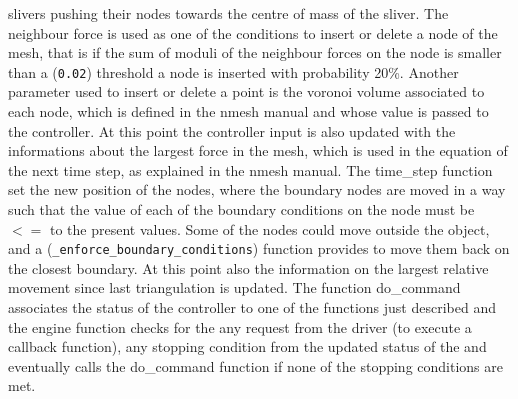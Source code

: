 \documentclass[12pt,twoside]{article}
\newcommand{\om}[1]{(\texttt{#1})}
\begin{document}
slivers pushing their nodes towards the centre of mass of the sliver. 
The neighbour force is used as one of the conditions to insert or
delete a node of the mesh, that is if the sum of moduli of the
neighbour forces on the node is smaller than a \om{0.02} threshold a
node is inserted with probability 20\%. Another parameter used to
insert or delete a point is the voronoi volume associated to each
node, which is defined in the nmesh manual and whose value is passed
to the controller. At this point the controller input is also updated
with the informations about the largest force in the mesh, which is
used in the equation of the next time step, as explained in the nmesh
manual. The time\_step function set the new position of the nodes,
where the boundary nodes are moved in a way such that the value of
each of the boundary conditions on the node must be $<=$ to the
present values. Some of the nodes could move outside the object, and a
\om{\_enforce\_boundary\_conditions} function provides to move them back
on the closest boundary. At this point also the information on the
largest relative movement since last triangulation is updated.
The function do\_command associates the status of the controller to one
of the functions just described and the engine function checks for the
any request from the driver (to execute a callback function), any
stopping condition from the updated status of the and eventually calls
the do\_command function if none of the stopping conditions are met.     
\end{document}
